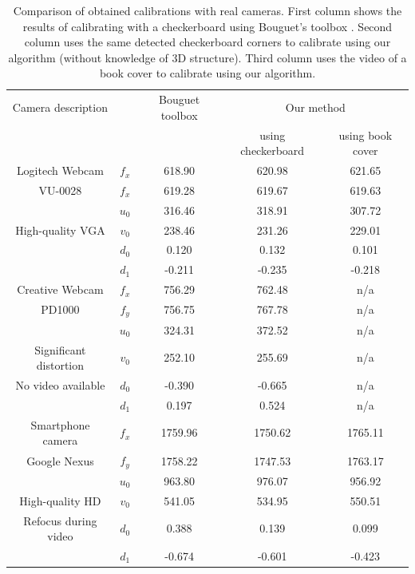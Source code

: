 \documentclass[10pt,twocolumn,letterpaper]{article}
\begin{document}
\begin{table}
\caption{Comparison of obtained calibrations with real cameras. First column shows the results of calibrating with a checkerboard using Bouguet's toolbox \cite{bouguetMCT}. Second column uses the same detected checkerboard corners to calibrate using our algorithm (without knowledge of 3D structure). Third column uses the video of a book cover to calibrate using our algorithm.}
\label{fig:results_real_numbers}
\centering
\begin{tabular}{|c|c|c|c|c|}
\hline
Camera description & & Bouguet toolbox \cite{bouguetMCT} & \multicolumn{2}{|c|}{Our method} \\
 & & & using checkerboard & using book cover \\
 \hline
 Logitech Webcam & $f_x$ & 618.90 & 620.98 & 621.65 \\
VU-0028 & $f_x$ & 619.28 & 619.67 & 619.63 \\
 & $u_0$ & 316.46 & 318.91 &  307.72 \\
High-quality VGA & $v_0$ & 238.46 & 231.26 &  229.01 \\
 & $d_0$ & 0.120 & 0.132  &  0.101 \\
  & $d_1$ & -0.211 & -0.235 &  -0.218 \\
  \hline

Creative Webcam & $f_x$ & 756.29 & 762.48 & n/a \\
PD1000 & $f_y$ & 756.75 & 767.78 & n/a \\
& $u_0$ & 324.31 & 372.52 & n/a \\
Significant distortion& $v_0$ & 252.10 & 255.69 & n/a \\
No video available& $d_0$ & -0.390 & -0.665 & n/a \\
& $d_1$ & 0.197 & 0.524 & n/a \\
\hline

Smartphone camera & $f_x$ & 1759.96 & 1750.62 & 1765.11 \\
Google Nexus & $f_y$ & 1758.22 & 1747.53 & 1763.17 \\
& $u_0$ & 963.80 & 976.07 & 956.92 \\
High-quality HD& $v_0$ & 541.05 & 534.95 & 550.51 \\
Refocus during video & $d_0$ & 0.388 & 0.139 & 0.099 \\
& $d_1$ & -0.674 & -0.601 & -0.423 \\
\hline
\end{tabular}
\end{table}
\end{document}

